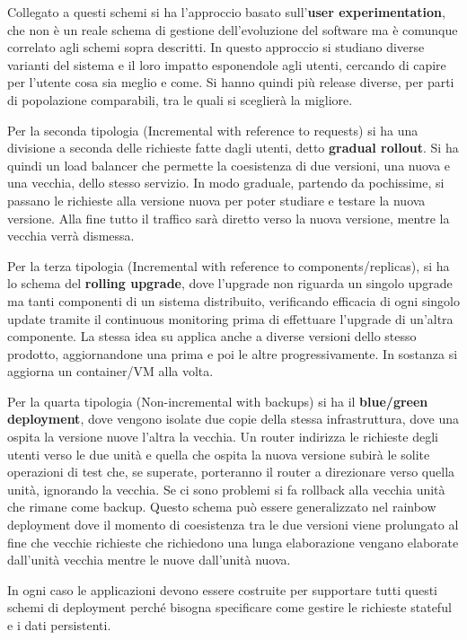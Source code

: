 Collegato a questi schemi si ha l'approccio basato sull'\textbf{user experimentation},
che non è un reale schema di gestione dell'evoluzione del software ma è comunque
correlato agli schemi sopra descritti. In questo approccio si studiano diverse
varianti del sistema e il loro impatto esponendole agli utenti, cercando di capire
per l'utente cosa sia meglio e come. Si hanno quindi più release diverse, per
parti di popolazione comparabili, tra le quali si sceglierà la migliore.

Per la seconda tipologia (Incremental with reference to requests) si ha una
divisione a seconda delle richieste fatte dagli utenti, detto \textbf{gradual
      rollout}. Si ha quindi un load balancer che permette la coesistenza di due
versioni, una nuova e una vecchia, dello stesso servizio. In modo graduale,
partendo da pochissime, si passano le richieste alla versione nuova per poter
studiare e testare la nuova versione. Alla fine tutto il traffico sarà diretto
verso la nuova versione, mentre la vecchia verrà dismessa.

Per la terza tipologia (Incremental with reference to components/replicas),
si ha lo schema del \textbf{rolling upgrade}, dove l'upgrade non riguarda un
singolo upgrade ma tanti componenti di un sistema distribuito, verificando efficacia
di ogni singolo update tramite il continuous monitoring prima di effettuare l'upgrade
di un'altra componente. La stessa idea su applica anche a diverse versioni dello
stesso prodotto, aggiornandone una prima e poi le altre progressivamente. In
sostanza si aggiorna un container/VM alla volta.

Per la quarta tipologia (Non-incremental with backups) si ha il
\textbf{blue/green deployment}, dove vengono isolate due copie della stessa
infrastruttura, dove una ospita la versione nuove l'altra la vecchia. Un router
indirizza le richieste degli utenti verso le due unità e quella che ospita la
nuova versione subirà le solite operazioni di test che, se superate, porteranno
il router a direzionare verso quella unità, ignorando la vecchia. Se ci sono problemi
si fa rollback alla vecchia unità che rimane come backup. Questo schema può essere
generalizzato nel rainbow deployment dove il momento di coesistenza tra le due
versioni viene prolungato al fine che vecchie richieste che richiedono una lunga
elaborazione vengano elaborate dall'unità vecchia mentre le nuove dall'unità nuova.

In ogni caso le applicazioni devono essere costruite per supportare tutti questi
schemi di deployment perché bisogna specificare come gestire le richieste stateful
e i dati persistenti.
